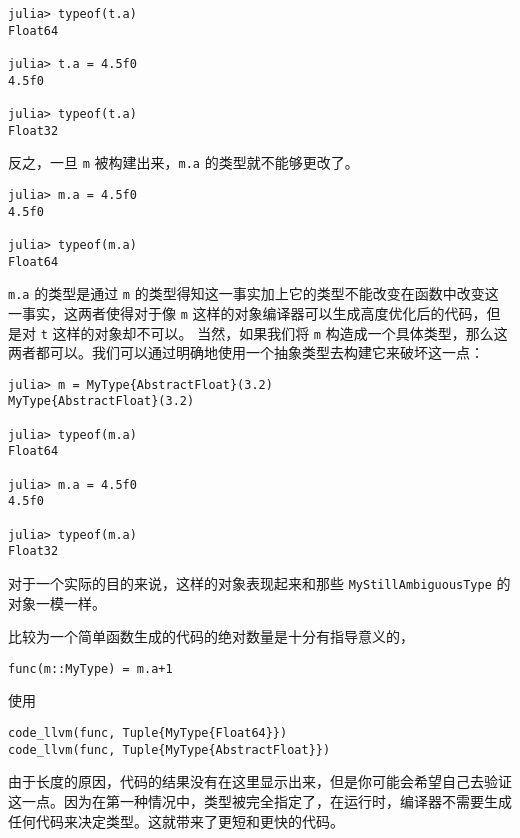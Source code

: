 \begin{verbatim}
julia> typeof(t.a)
Float64

julia> t.a = 4.5f0
4.5f0

julia> typeof(t.a)
Float32
\end{verbatim}



反之，一旦 \texttt{m} 被构建出来，\texttt{m.a} 的类型就不能够更改了。




\begin{verbatim}
julia> m.a = 4.5f0
4.5f0

julia> typeof(m.a)
Float64
\end{verbatim}



\texttt{m.a} 的类型是通过 \texttt{m} 的类型得知这一事实加上它的类型不能改变在函数中改变这一事实，这两者使得对于像 \texttt{m} 这样的对象编译器可以生成高度优化后的代码，但是对 \texttt{t} 这样的对象却不可以。 当然，如果我们将 \texttt{m} 构造成一个具体类型，那么这两者都可以。我们可以通过明确地使用一个抽象类型去构建它来破坏这一点：




\begin{verbatim}
julia> m = MyType{AbstractFloat}(3.2)
MyType{AbstractFloat}(3.2)

julia> typeof(m.a)
Float64

julia> m.a = 4.5f0
4.5f0

julia> typeof(m.a)
Float32
\end{verbatim}



对于一个实际的目的来说，这样的对象表现起来和那些 \texttt{MyStillAmbiguousType} 的对象一模一样。



比较为一个简单函数生成的代码的绝对数量是十分有指导意义的，




\begin{verbatim}
func(m::MyType) = m.a+1
\end{verbatim}



使用




\begin{verbatim}
code_llvm(func, Tuple{MyType{Float64}})
code_llvm(func, Tuple{MyType{AbstractFloat}})
\end{verbatim}



由于长度的原因，代码的结果没有在这里显示出来，但是你可能会希望自己去验证这一点。因为在第一种情况中，类型被完全指定了，在运行时，编译器不需要生成任何代码来决定类型。这就带来了更短和更快的代码。



